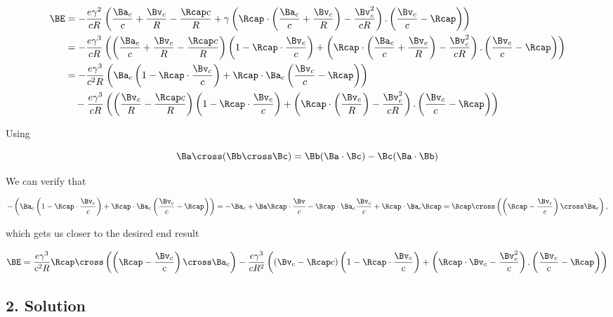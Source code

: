 \begin{align*}
\BE
&= - \frac{e \gamma^2}{c R} \left( 
\frac{\Ba_c}{c} 
+\frac{\Bv_c}{R} 
- \frac{\Rcap c}{R}
+ \gamma \left( \Rcap \cdot \left( \frac{\Ba_c}{c} + \frac{\Bv_c}{R} \right) - \frac{\Bv_c^2}{c R} \right).
\left( \frac{\Bv_c}{c} - \Rcap \right)
\right) \\
&= - \frac{e \gamma^3}{c R} \left( 
\left(
\frac{\Ba_c}{c} 
+\frac{\Bv_c}{R} 
- \frac{\Rcap c}{R}
\right) \left(
1 -\Rcap \cdot \frac{\Bv_c}{c} 
\right)
+ \left( \Rcap \cdot \left( \frac{\Ba_c}{c} + \frac{\Bv_c}{R} \right) - \frac{\Bv_c^2}{c R} \right).
\left( \frac{\Bv_c}{c} - \Rcap \right)
\right) \\
&= 
- \frac{e \gamma^3}{c^2 R} \left( 
\Ba_c
\left(
1 -\Rcap \cdot \frac{\Bv_c}{c} 
\right)
+\Rcap \cdot \Ba_c \left( \frac{\Bv_c}{c} - \Rcap \right)
\right) \\
&\quad - \frac{e \gamma^3}{c R} \left( 
\left(
\frac{\Bv_c}{R} 
- \frac{\Rcap c}{R}
\right) 
\left(
1 -\Rcap \cdot \frac{\Bv_c}{c} 
\right)
+ \left( \Rcap \cdot \left( \frac{\Bv_c}{R} \right) - \frac{\Bv_c^2}{c R} \right).
\left( \frac{\Bv_c}{c} - \Rcap \right)
\right) \\
\end{align*}

Using

\begin{equation}\label{eqn:relElectroDynProblemSet5:n}
\Ba \cross (\Bb \cross \Bc) = \Bb (\Ba \cdot \Bc) - \Bc (\Ba \cdot \Bb)
\end{equation}

We can verify that

\begin{equation}\label{eqn:relElectroDynProblemSet5:n}
- \left( 
\Ba_c
\left(
1 -\Rcap \cdot \frac{\Bv_c}{c} 
\right)
+\Rcap \cdot \Ba_c \left( \frac{\Bv_c}{c} - \Rcap \right)
\right) 
=
-\Ba_c + \Ba \Rcap \cdot \frac{\Bv}{c} - \Rcap \cdot \Ba_c \frac{\Bv_c}{c} + \Rcap \cdot \Ba_c \Rcap = \Rcap \cross \left( \left(\Rcap - \frac{\Bv_c}{c} \right) \cross \Ba_c \right),
\end{equation}

which gets us closer to the desired end result

\begin{align*}
\BE
&= 
\frac{e \gamma^3}{c^2 R} \Rcap \cross \left( \left(\Rcap - \frac{\Bv_c}{c} \right) \cross \Ba_c \right)
- \frac{e \gamma^3}{c R^2} \left( 
\left(
\Bv_c
- \Rcap c
\right) 
\left(
1 -\Rcap \cdot \frac{\Bv_c}{c} 
\right)
+ \left( \Rcap \cdot \Bv_c - \frac{\Bv_c^2}{c} \right).
\left( \frac{\Bv_c}{c} - \Rcap \right)
\right) \\
\end{align*}

\subsection{2. Solution}

\EndArticle
